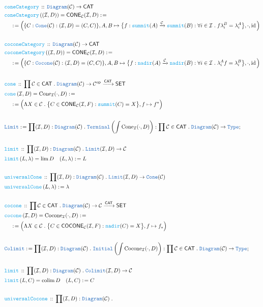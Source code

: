 \documentclass[12pt]{scrartcl}
\newcommand{\TYPE}[1]{\textcolor{NavyBlue}{\mathtt{#1}}}
\newcommand{\FUNC}[1]{\textcolor{Cerulean}{\mathtt{#1}}}
\renewcommand{\.}{\; . \;}
\newcommand{\de}{: \kern 0.1pc =}
\newcommand{\Act}[1]{\left( #1 \right)}
\newcommand{\DeclareFunc}[2]{& \FUNC{#1} \, :: \, #2 \\}
\newcommand{\DefineFunc}[3]{&  \FUNC{#1}\Act{#2} \de #3 \\}
\newcommand{\DefineNamedFunc}[4]{&  \FUNC{#1}\Act{#2} = #3 \de #4 \\}
\newcommand{\NewLine}{\\ & \kern 1pc}
\newcommand{\Page}[1]{ \begin{align*} #1 \end{align*}   }
\newcommand{\Type}{\TYPE{Type}}
\DeclareMathOperator*{\id}{id}
\newcommand{\Arrow}{\xrightarrow}
\newcommand{\Conclude}[3]{& #1 \de #2 : #3; \\}
\newcommand{\op}{\mathrm{op}}
\DeclareMathOperator*{\colim}{colim}
\newcommand{\C}{\mathcal{C}}
\newcommand{\I}{\mathcal{I}}
\newcommand{\CAT}{\mathsf{CAT}}
\newcommand{\SET}{\mathsf{SET}}
\begin{document}
\Page{
	\DeclareFunc{coneCategory}{ \TYPE{Diagram}(\C) \to \CAT   }
	\DefineNamedFunc{coneCategory}{(\I,D)}{\mathsf{CONE}_\C(\I,D)}
	{ 
		\NewLine \de \Big( \{ C : \TYPE{Cone}(\C) : (\I,D) = (C,C)  \}, A,B \mapsto 
		\big\{ f : \FUNC{summit}(A) \Arrow{\C} \FUNC{summit}(B) 
		: \forall i \in \I  \. f\lambda_i^B = \lambda_i^A   \big\}, \cdot, \id  \Big)  
	}
	\\
	\DeclareFunc{coconeCategory}{ \TYPE{Diagram}(\C) \to \CAT   }
	\DefineNamedFunc{coconeCategory}{(\I,D)}{\mathsf{CONE}_\C(\I,D)}
	{ 
		\NewLine \de \Big( \{ C : \TYPE{Cocone}(\C) : (\I,D) = (C,C)  \}, A,B \mapsto 
		\big\{ f : \FUNC{nadir}(A) \Arrow{\C} \FUNC{nadir}(B) 
		: \forall i \in \I  \.  \lambda_i^A f = \lambda_i^B   \big\}, \cdot, \id  \Big)  
	}
	\\
	\DeclareFunc{cone}{ \prod \C \in \CAT \. \TYPE{Diagram}(\C) \to \C^\op \Arrow{\CAT} \SET }
	\DefineNamedFunc{cone}{\I,D}{\mathrm{Cone}_\I(\cdot,D)}
	{ 	\NewLine \de
		\Big( \Lambda X \in \C \. \big\{ C \in  \mathsf{CONE}_\C(\I,F)  : \FUNC{summit}(C) = X \big\}, 
		f \mapsto f^*\Big) 
	}
	\\
	\Conclude{\TYPE{Limit}}{\prod (\I,D) : \TYPE{Diagram}(\C) \. 
		\TYPE{Terminal}\left( \int \mathrm{Cone}_\I(\cdot,D)  \right) }
	{ \prod \C \in \CAT \. \TYPE{Diagram}(\C) \to \Type  }
	\\
	\DeclareFunc{ limit }{\prod (\I,D) : \TYPE{Diagram}(\C) \. \TYPE{Limit}(\I,D) \to \C}
	\DefineNamedFunc{limit}{L,\lambda}{ \lim D \quad (L,\lambda) }{ L }
	\\
	\DeclareFunc{universalCone}{\prod (\I,D) : \TYPE{Diagram}(\C) \. 
		   \TYPE{Limit}(\I,D) \to \TYPE{Cone}(\C) }
	\DefineFunc{universalCone}{L,\lambda}{ \lambda  }
	\\
	\DeclareFunc{cocone}{ \prod \C \in \CAT \. \TYPE{Diagram}(\C) \to \C \Arrow{\CAT} \SET }
	\DefineNamedFunc{cocone}{\I,D}{\mathrm{Cocone}_\I(\cdot,D)}
	{ 	\NewLine \de
		\Big( \Lambda X \in \C \. \big\{ C \in  \mathsf{COCONE}_\C(\I,F)  : \FUNC{nadir}(C) = X \big\}, 
		f \mapsto f_*\Big) 
	}
	\\
	\Conclude{\TYPE{Colimit}}{\prod (\I,D) : \TYPE{Diagram}(\C) \. 
		\TYPE{Initial}\left(  \int \mathrm{Cocone}_\I(\cdot,D)  \right) }
	{ \prod \C \in \CAT \. \TYPE{Diagram}(\C) \to \Type  }
	\\
	\DeclareFunc{ limit }{\prod (\I,D) : \TYPE{Diagram}(\C) \. \TYPE{Colimit}(\I,D) \to \C}
	\DefineNamedFunc{limit}{L,C}{ \colim D \quad (L,C) }{ C }
	\\
	\DeclareFunc{universalCocone}{\prod (\I,D) : \TYPE{Diagram}(\C) \. 
}}
\end{document}
